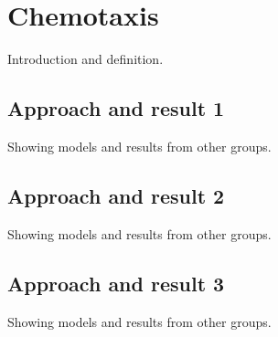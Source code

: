 \chapter{Chemotaxis}\label{ch:chemotaxis}
Introduction and definition.\newline
\lipsum[1-5]


\section{Approach and result 1}
Showing models and results from other groups.\newline
\lipsum[1-2]


\section{Approach and result 2}
Showing models and results from other groups.\newline
\lipsum[1-2]


\section{Approach and result 3}
Showing models and results from other groups.\newline
\lipsum[1-2]

